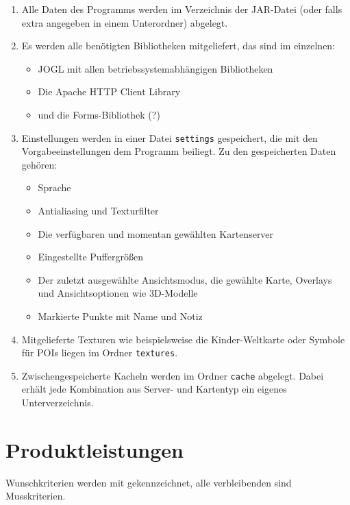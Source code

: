 \documentclass[10pt]{scrreprt}
\begin{document}
\begin{enumerate}[leftmargin=2cm]
\item Alle Daten des Programms werden im Verzeichnis der JAR-Datei (oder falls extra angegeben in einem Unterordner) abgelegt.
\item Es werden alle benötigten Bibliotheken mitgeliefert, das sind im einzelnen: 
\begin{itemize}
\item JOGL mit allen betriebssystemabhängigen Bibliotheken
\item Die Apache HTTP Client Library
\item und die Forms-Bibliothek (?)
\end{itemize}
\item Einstellungen werden in einer Datei \texttt{settings} gespeichert, die mit den Vorgabeeinstellungen dem Programm beiliegt. Zu den gespeicherten Daten gehören:
\begin{itemize}
\item Sprache
\item Antialiasing und Texturfilter
\item Die verfügbaren und momentan gewählten Kartenserver
\item Eingestellte Puffergrößen
\item Der zuletzt ausgewählte Ansichtsmodus, die gewählte Karte, Overlays und Ansichtsoptionen wie 3D-Modelle
\item Markierte Punkte mit Name und Notiz
\end{itemize}
\item Mitgelieferte Texturen wie beispielsweise die Kinder-Weltkarte oder Symbole für POIs liegen im Ordner \texttt{textures}.
\item Zwischengespeicherte Kacheln werden im Ordner \texttt{cache} abgelegt. Dabei erhält jede Kombination aus Server- und Kartentyp ein eigenes Unterverzeichnis.
\end{enumerate}


\chapter{Produktleistungen}

\renewcommand{\labelenumi}{\textbf{/L\numprint{\theenumi}0/}}
Wunschkriterien werden mit \W  gekennzeichnet, alle verbleibenden sind Musskriterien.
\end{document}
